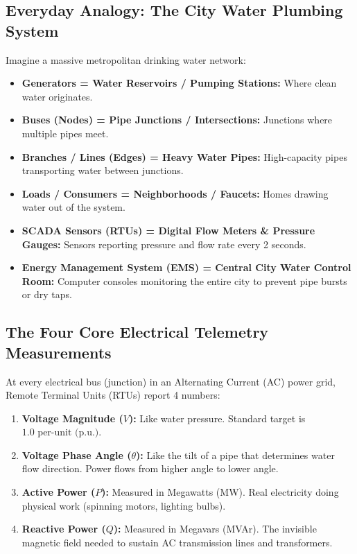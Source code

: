 \documentclass[10pt,a4paper]{article}
\begin{document}
\subsection{Everyday Analogy: The City Water Plumbing System}
Imagine a massive metropolitan drinking water network:
\begin{itemize}[noitemsep]
    \item \textbf{Generators = Water Reservoirs / Pumping Stations:} Where clean water originates.
    \item \textbf{Buses (Nodes) = Pipe Junctions / Intersections:} Junctions where multiple pipes meet.
    \item \textbf{Branches / Lines (Edges) = Heavy Water Pipes:} High-capacity pipes transporting water between junctions.
    \item \textbf{Loads / Consumers = Neighborhoods / Faucets:} Homes drawing water out of the system.
    \item \textbf{SCADA Sensors (RTUs) = Digital Flow Meters \& Pressure Gauges:} Sensors reporting pressure and flow rate every 2 seconds.
    \item \textbf{Energy Management System (EMS) = Central City Water Control Room:} Computer consoles monitoring the entire city to prevent pipe bursts or dry taps.
\end{itemize}

\subsection{The Four Core Electrical Telemetry Measurements}
At every electrical bus (junction) in an Alternating Current (AC) power grid, Remote Terminal Units (RTUs) report 4 numbers:
\begin{enumerate}[noitemsep]
    \item \textbf{Voltage Magnitude ($V$):} Like water pressure. Standard target is $1.0\text{ per-unit (p.u.)}$.
    \item \textbf{Voltage Phase Angle ($\theta$):} Like the tilt of a pipe that determines water flow direction. Power flows from higher angle to lower angle.
    \item \textbf{Active Power ($P$):} Measured in Megawatts (MW). Real electricity doing physical work (spinning motors, lighting bulbs).
    \item \textbf{Reactive Power ($Q$):} Measured in Megavars (MVAr). The invisible magnetic field needed to sustain AC transmission lines and transformers.
\end{enumerate}
\end{document}
